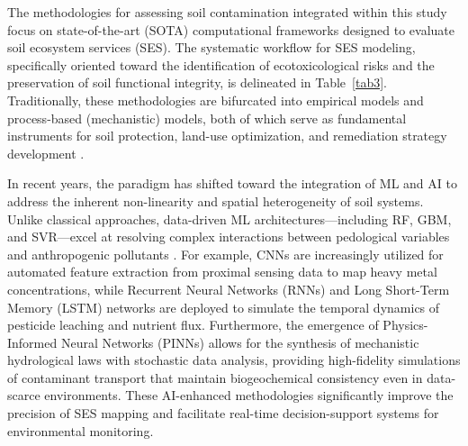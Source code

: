\documentclass[sn-mathphys-num]{sn-jnl}
\begin{document}
The methodologies for assessing soil contamination integrated within this
study focus on state-of-the-art (SOTA) computational frameworks designed to
evaluate soil ecosystem services (SES). The systematic workflow for SES
modeling, specifically oriented toward the identification of ecotoxicological
risks and the preservation of soil functional integrity, is delineated in
Table~\ref{tab3}. Traditionally, these methodologies are bifurcated into
empirical models and process-based (mechanistic) models, both of which serve
as fundamental instruments for soil protection, land-use optimization, and
remediation strategy development
\cite{TeranGomez2025,ElSorogy2025,Lemenkova2020,Lemenkova2021,Sandu2025}.

In recent years, the paradigm has shifted toward the integration of ML and AI
to address the inherent non-linearity and spatial heterogeneity of soil
systems. Unlike classical approaches, data-driven ML architectures---including
RF, GBM, and SVR---excel at resolving complex interactions between pedological
variables and anthropogenic pollutants \cite{Li2025a,Racic2025}. For example,
CNNs are increasingly utilized for automated feature extraction from proximal
sensing data to map heavy metal concentrations, while Recurrent Neural
Networks (RNNs) and Long Short-Term Memory (LSTM) networks are deployed to
simulate the temporal dynamics of pesticide leaching and nutrient flux.
Furthermore, the emergence of Physics-Informed Neural Networks (PINNs) allows
for the synthesis of mechanistic hydrological laws with stochastic data
analysis, providing high-fidelity simulations of contaminant transport that
maintain biogeochemical consistency even in data-scarce environments. These
AI-enhanced methodologies significantly improve the precision of SES mapping
and facilitate real-time decision-support systems for environmental monitoring.
\end{document}
